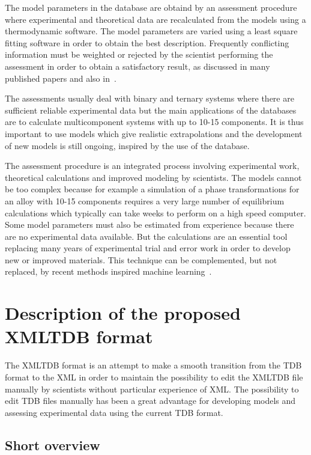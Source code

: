 \documentclass[12pt]{article}
\begin{document}
The model parameters in the database are obtaind by an assessment
procedure where experimental and theoretical data are recalculated
from the models using a thermodynamic software.  The model parameters
are varied using a least square fitting software in order to obtain
the best description.  Frequently conflicting information must be
weighted or rejected by the scientist performing the assessment in
order to obtain a satisfactory result, as discussed in many published
papers and also in~\cite{09Luk}.

The assessments usually deal with binary and ternary systems where
there are sufficient reliable experimental data but the main
applications of the databases are to calculate multicomponent systems
with up to 10-15 components.  It is thus important to use models which
give realistic extrapolations and the development of new models is
still ongoing, inspired by the use of the database.

The assessment procedure is an integrated process involving
experimental work, theoretical calculations and improved modeling by
scientists.  The models cannot be too complex because for example a
simulation of a phase transformations for an alloy with 10-15
components requires a very large number of equilibrium calculations
which typically can take weeks to perform on a high speed computer.
Some model parameters must also be estimated from experience because
there are no experimental data available.  But the calculations are an
essential tool replacing many years of experimental trial and error
work in order to develop new or improved materials.  This technique
can be complemented, but not replaced, by recent methods inspired
machine learning~\cite{ML1,ML2}.

\section{Description of the proposed XMLTDB format}

The XMLTDB format is an attempt to make a smooth transition from the
TDB format to the XML in order to maintain the possibility to edit the
XMLTDB file manually by scientists without particular experience of
XML.  The possibility to edit TDB files manually has been a great
advantage for developing models and assessing experimental data using
the current TDB format.

\subsection{Short overview}
\end{document}
